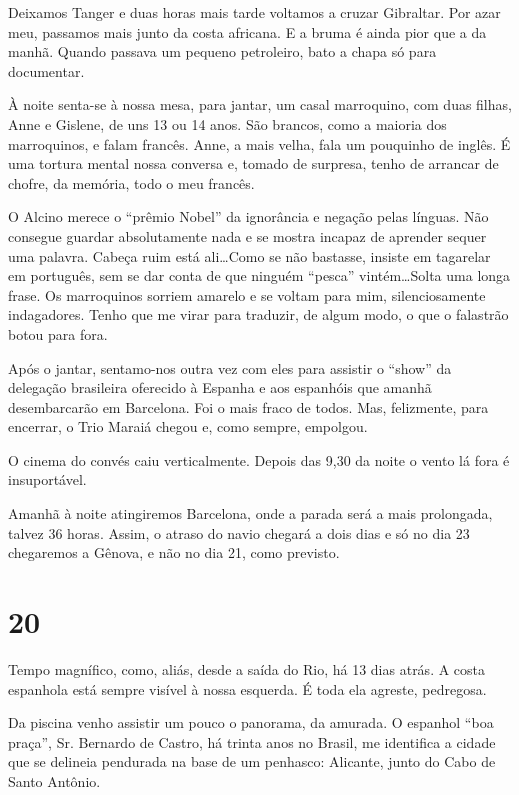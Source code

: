 Deixamos Tanger e duas horas mais tarde voltamos a cruzar Gibraltar. Por azar meu, passamos mais junto da costa africana. E a bruma é ainda pior que a da manhã. Quando passava um pequeno petroleiro, bato a chapa só para documentar.

À noite senta-se à nossa mesa, para jantar, um casal marroquino, com duas filhas, Anne e Gislene, de uns 13 ou 14 anos. São brancos, como a maioria dos marroquinos, e falam francês. Anne, a mais velha, fala um pouquinho de inglês. É uma tortura mental nossa conversa e, tomado de surpresa, tenho de arrancar de chofre, da memória, todo o meu francês.

O Alcino merece o ``prêmio Nobel'' da ignorância e negação pelas línguas. Não consegue guardar absolutamente nada e se mostra incapaz de aprender sequer uma palavra. Cabeça ruim está ali\ldots Como se não bastasse, insiste em tagarelar em português, sem se dar conta de que ninguém ``pesca'' vintém\ldots Solta uma longa frase. Os marroquinos sorriem amarelo e se voltam para mim, silenciosamente indagadores. Tenho que me virar para traduzir, de algum modo, o que o falastrão botou para fora.

Após o jantar, sentamo-nos outra vez com eles para assistir o ``show'' da delegação brasileira oferecido à Espanha e aos espanhóis que amanhã desembarcarão em Barcelona. Foi o mais fraco de todos. Mas, felizmente, para encerrar, o Trio Maraiá chegou e, como sempre, empolgou.

O cinema do convés caiu verticalmente. Depois das 9,30 da noite o vento lá fora é insuportável.

Amanhã à noite atingiremos Barcelona, onde a parada será a mais prolongada, talvez 36 horas. Assim, o atraso do navio chegará a dois dias e só no dia 23 chegaremos a Gênova, e não no dia 21, como previsto.

\section*{20 \adfflatleafright {}}

Tempo magnífico, como, aliás, desde a saída do Rio, há 13 dias atrás. A costa espanhola está sempre visível à nossa esquerda. É toda ela agreste, pedregosa.

Da piscina venho assistir um pouco o panorama, da amurada. O espanhol ``boa praça'', Sr. Bernardo de Castro, há trinta anos no Brasil, me identifica a cidade que se delineia pendurada na base de um penhasco: Alicante, junto do Cabo de Santo Antônio.

